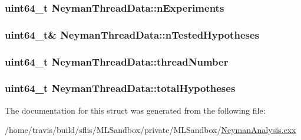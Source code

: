 \hypertarget{structNeymanThreadData_a99154b06d67a82c8bf48112beabbd7ec}{
\subsubsection[{n\-Experiments}]{\setlength{\rightskip}{0pt plus 5cm}uint64\-\_\-t Neyman\-Thread\-Data\-::n\-Experiments}}\label{structNeymanThreadData_a99154b06d67a82c8bf48112beabbd7ec}
\hypertarget{structNeymanThreadData_acab7f8af86761370c3bb06132b0e92f5}{
\subsubsection[{n\-Tested\-Hypotheses}]{\setlength{\rightskip}{0pt plus 5cm}uint64\-\_\-t\& Neyman\-Thread\-Data\-::n\-Tested\-Hypotheses}}\label{structNeymanThreadData_acab7f8af86761370c3bb06132b0e92f5}
\hypertarget{structNeymanThreadData_a0d26db26796419914c2a9a35214a26b3}{
\subsubsection[{thread\-Number}]{\setlength{\rightskip}{0pt plus 5cm}uint64\-\_\-t Neyman\-Thread\-Data\-::thread\-Number}}\label{structNeymanThreadData_a0d26db26796419914c2a9a35214a26b3}
\hypertarget{structNeymanThreadData_a129c6ff7d2f1d5102fa6543ff0683d1b}{
\subsubsection[{total\-Hypotheses}]{\setlength{\rightskip}{0pt plus 5cm}uint64\-\_\-t Neyman\-Thread\-Data\-::total\-Hypotheses}}\label{structNeymanThreadData_a129c6ff7d2f1d5102fa6543ff0683d1b}


The documentation for this struct was generated from the following file\-:\begin{DoxyCompactItemize}
\item 
/home/travis/build/sflis/\-M\-L\-Sandbox/private/\-M\-L\-Sandbox/\hyperlink{MLSandbox_2NeymanAnalysis_8cxx}{Neyman\-Analysis.\-cxx}\end{DoxyCompactItemize}

